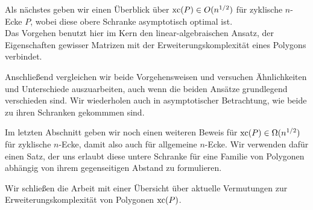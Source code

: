 Als nächstes geben wir einen Überblick über $\operatorname{xc}(P) \in O(n^{1/2})$ für zyklische $n$-Ecke $P$, wobei diese obere Schranke asymptotisch optimal ist.\\
Das Vorgehen benutzt hier im Kern den linear-algebraischen Ansatz, der Eigenschaften gewisser Matrizen mit der Erweiterungskomplexität eines Polygons verbindet. 

Anschließend vergleichen wir beide Vorgehensweisen und versuchen Ähnlichkeiten und Unterschiede auszuarbeiten, auch wenn die beiden Ansätze grundlegend verschieden sind. Wir wiederholen auch in asymptotischer Betrachtung, wie beide zu ihren Schranken gekommmen sind.

Im letzten Abschnitt geben wir noch einen weiteren Beweis für $\operatorname{xc}(P) \in \Omega(n^{1/2})$ für zyklische $n$-Ecke, damit also auch für allgemeine $n$-Ecke. Wir verwenden dafür einen Satz, der uns erlaubt diese untere Schranke für eine Familie von Polygonen abhängig von ihrem gegenseitigen Abstand zu formulieren.

Wir schließen die Arbeit mit einer Übersicht über aktuelle Vermutungen zur Erweiterungskomplexität von Polygonen $\operatorname{xc}(P)$.

\newpage
